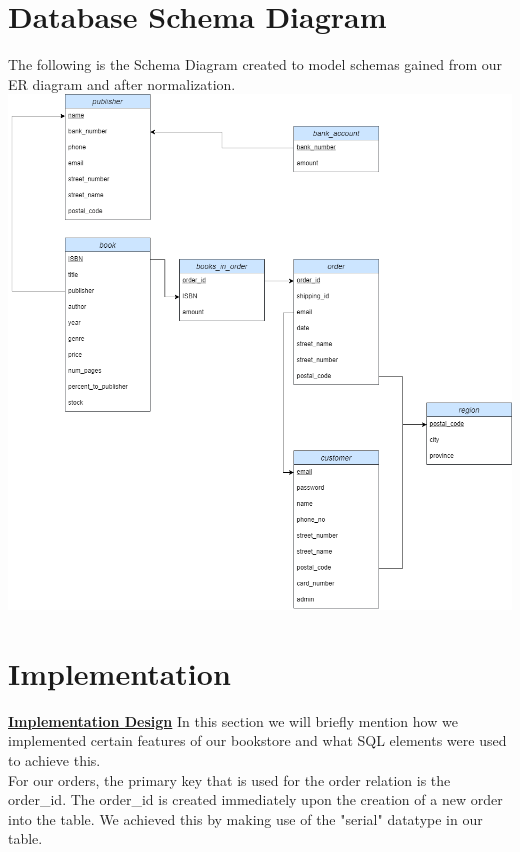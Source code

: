 \documentclass[a4 paper]{article}
\begin{document}
\section{Database Schema Diagram}

The following is the Schema Diagram created to model schemas gained from our ER diagram and after normalization.\\

\includegraphics[scale=0.5]{../Diagrams/Schema-diagram-comp3005-finalproject-after-normalization.drawio.png}\\

\section{Implementation}
\underline{\textbf{Implementation Design}}
In this section we will briefly mention how we implemented certain features of our bookstore and what SQL elements were used to achieve this.\\

For our orders, the primary key that is used for the order relation is the order\_id. The order\_id is created immediately upon the creation of a new order into the table. We achieved this by making use of the "serial" datatype in our table.\\
\end{document}
